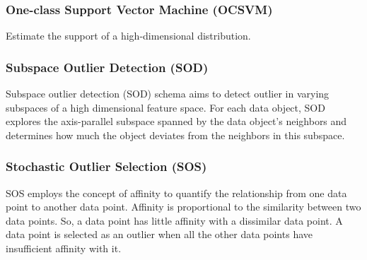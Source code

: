\subsubsection{One-class Support Vector Machine (OCSVM)}
Estimate the support of a high-dimensional distribution.
\cite{sholkopf2001ocsvm}

\subsubsection{Subspace Outlier Detection (SOD)}
Subspace outlier detection (SOD) schema aims to detect outlier in varying subspaces of a high dimensional feature space. For each data object, SOD explores the axis-parallel subspace spanned by the data object’s neighbors and determines how much the object deviates from the neighbors in this subspace.
\cite{kriegel2009sod}

\subsubsection{Stochastic Outlier Selection (SOS)}
SOS employs the concept of affinity to quantify the relationship from one data point to another data point. Affinity is proportional to the similarity between two data points. So, a data point has little affinity with a dissimilar data point. A data point is selected as an outlier when all the other data points have insufficient affinity with it.
\cite{janssens2012sos}



